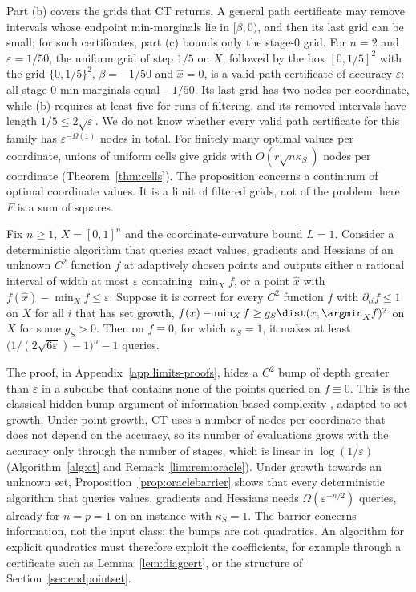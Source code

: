 Part (b) covers the grids that CT returns. A general path certificate may
remove intervals whose endpoint min-marginals lie in $[\beta,0)$, and then
its last grid can be small; for such certificates, part (c) bounds only the
stage-$0$ grid. For
$n=2$ and $\varepsilon=1/50$, the uniform grid of step $1/5$ on $X$, followed by
the box $[0,1/5]^2$ with the grid $\{0,1/5\}^2$, $\beta=-1/50$ and $\hat x=0$,
is a valid path certificate of accuracy $\varepsilon$: all stage-$0$
min-marginals equal $-1/50$. Its last grid has two nodes per coordinate,
while (b) requires at least five for runs of filtering, and its removed
intervals have length $1/5\le2\sqrt\varepsilon$. We do not know whether every
valid path certificate for this family has $\varepsilon^{-\Omega(1)}$ nodes in
total. For finitely many optimal values per coordinate, unions of uniform
cells give grids with $O(r\sqrt{n\kappa_S})$ nodes per coordinate
(Theorem~\ref{thm:cells}). The proposition concerns a
continuum of optimal coordinate values. It is a limit of filtered grids, not
of the problem: here $F$ is a sum of squares.

\begin{proposition}\label{prop:oraclebarrier}
Fix $n\ge1$, $X=[0,1]^n$ and the coordinate-curvature bound $L=1$. Consider a
deterministic algorithm that queries exact values, gradients and Hessians of
an unknown $C^2$ function $f$ at adaptively chosen points and outputs either a
rational interval of width at most $\varepsilon$ containing $\min_Xf$, or a
point $\hat x$ with $f(\hat x)-\min_Xf\le\varepsilon$. Suppose it is correct
for every $C^2$ function $f$ with $\partial_{ii}f\le1$ on $X$ for all $i$ that
has set growth, $f(x)-\min_Xf\ge g_S\dist(x,\argmin_Xf)^2$ on $X$ for some
$g_S>0$. Then on $f\equiv0$, for which $\kappa_S=1$, it makes at least
$\bigl(1/(2\sqrt{6\varepsilon})-1\bigr)^n-1$ queries.
\end{proposition}

The proof, in Appendix~\ref{app:limits-proofs}, hides a $C^2$ bump of depth
greater than $\varepsilon$ in a subcube that contains none of the points
queried on $f\equiv0$. This is the classical hidden-bump argument of
information-based complexity \cite{NemirovskiYudin1983}, adapted to set
growth. Under point growth, CT uses a number of nodes per coordinate that
does not depend on the accuracy, so its number of evaluations grows with the
accuracy only through the number of stages, which is linear in
$\log(1/\varepsilon)$ (Algorithm~\ref{alg:ct} and
Remark~\ref{lim:rem:oracle}). Under growth towards an unknown set,
Proposition~\ref{prop:oraclebarrier} shows that every deterministic algorithm
that queries values, gradients and Hessians needs
$\Omega(\varepsilon^{-n/2})$ queries, already for $n=p=1$ on an instance with
$\kappa_S=1$. The barrier concerns information, not the input class: the
bumps are not quadratics. An algorithm for explicit quadratics must therefore
exploit the coefficients, for example through a certificate such as
Lemma~\ref{lem:diagcert}, or the structure of Section~\ref{sec:endpointset}.

